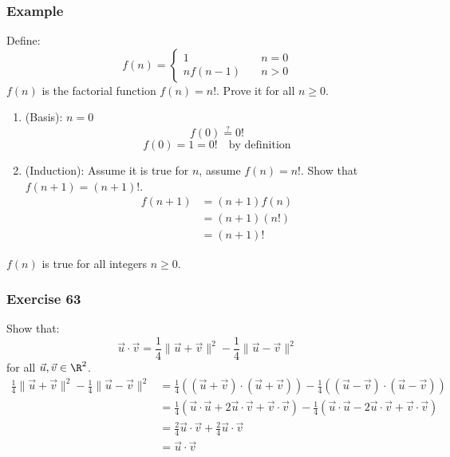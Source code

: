 \documentclass{math}
\begin{document}
\subsubsection*{Example}
Define:
\[ f(n) = \begin{cases}
  1 &\quad n = 0 \\
  nf(n-1) &\quad n > 0
\end{cases} \]
\( f(n) \) is the factorial function \( f(n) = n! \). Prove it for all \( n \ge
0 \).
\begin{enumerate}
  \item (Basis): \( n = 0 \)
    \[ f(0) \stackrel{?}{=} 0! \]
    \[ f(0) = 1 = 0! \quad \text{by definition} \]
  \item (Induction): Assume it is true for \( n \), assume \( f(n) = n! \).
    Show that \( f(n+1) = (n+1)! \).
    \begin{align*}
      f(n+1) &= (n+1)f(n) \\
      &= (n+1)(n!) \\
      &= (n+1)!
    \end{align*}
\end{enumerate}
\( f(n) \) is true for all integers \( n \ge 0 \).

\subsubsection*{Exercise 63}
Show that:
\[ \vec{u}\cdot\vec{v} = \frac{1}{4}\|\vec{u}+\vec{v}\|^2-
  \frac{1}{4}\|\vec{u}-\vec{v}\|^2 \]
for all \( \vec{u},\vec{v}\in\R^2 \).
\begin{align*}
  \frac{1}{4}\|\vec{u}+\vec{v}\|^2-\frac{1}{4}\|\vec{u}-\vec{v}\|^2
  &= \frac{1}{4}((\vec{u}+\vec{v})\cdot(\vec{u}+\vec{v}))-
    \frac{1}{4}((\vec{u}-\vec{v})\cdot(\vec{u}-\vec{v})) \\
  &= \frac{1}{4}(\vec{u}\cdot\vec{u}+2\vec{u}\cdot\vec{v}+\vec{v}\cdot\vec{v})-
    \frac{1}{4}(\vec{u}\cdot\vec{u}-2\vec{u}\cdot\vec{v}+\vec{v}\cdot\vec{v}) \\
  &= \frac{2}{4}\vec{u}\cdot\vec{v}+\frac{2}{4}\vec{u}\cdot\vec{v} \\
  &= \vec{u}\cdot\vec{v}
\end{align*}
\end{document}
